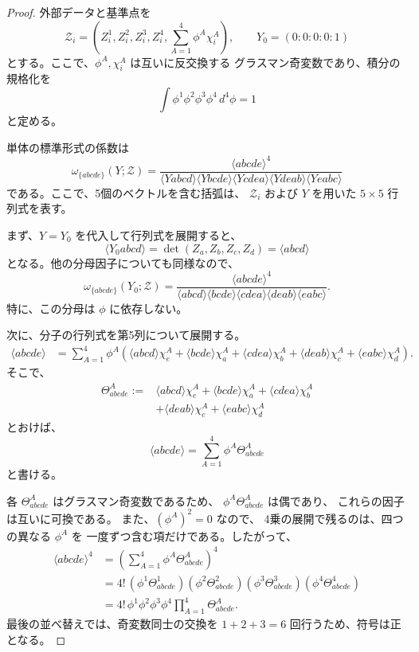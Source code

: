 \documentclass[uplatex,dvipdfmx,a4paper,11pt]{jsarticle}
\renewcommand{\proofname}{Proof}
\newenvironment{myproof}[1][\proofname]
  {\begin{proof}[#1]}
  {\end{proof}}
\numberwithin{equation}{section}
\begin{document}
\begin{myproof}
  外部データと基準点を
  \[
    \mathcal Z_i
      =
      \left(
        Z_i^1,Z_i^2,Z_i^3,Z_i^4,
        \sum_{A=1}^{4}\phi^A\chi_i^A
      \right),
    \qquad
    Y_0=(0:0:0:0:1)
  \]
  とする。ここで、$\phi^A,\chi_i^A$ は互いに反交換する
  グラスマン奇変数であり、積分の規格化を
  \[
    \int\phi^1\phi^2\phi^3\phi^4\,d^4\phi=1
  \]
  と定める。

  単体の標準形式の係数は
  \[
    \omega_{\{abcde\}}(Y;\mathcal Z)
      =
      \frac{
        \langle abcde\rangle^4
      }{
        \langle Yabcd\rangle
        \langle Ybcde\rangle
        \langle Ycdea\rangle
        \langle Ydeab\rangle
        \langle Yeabc\rangle
      }
  \]
  である。ここで、5個のベクトルを含む括弧は、
  $\mathcal Z_i$ および $Y$ を用いた
  $5\times5$ 行列式を表す。

  まず、$Y=Y_0$ を代入して行列式を展開すると、
  \[
    \langle Y_0abcd\rangle
      =\det(Z_a,Z_b,Z_c,Z_d)
      =\langle abcd\rangle
  \]
  となる。他の分母因子についても同様なので、
  \[
    \omega_{\{abcde\}}(Y_0;\mathcal Z)
      =
      \frac{
        \langle abcde\rangle^4
      }{
        \langle abcd\rangle
        \langle bcde\rangle
        \langle cdea\rangle
        \langle deab\rangle
        \langle eabc\rangle
      }.
  \]
  特に、この分母は $\phi$ に依存しない。

  次に、分子の行列式を第5列について展開する。
  \[
    \begin{aligned}
      \langle abcde\rangle
      &=
      \sum_{A=1}^{4}\phi^A
      \left(
        \langle abcd\rangle\chi_e^A
        +\langle bcde\rangle\chi_a^A
        +\langle cdea\rangle\chi_b^A
        +\langle deab\rangle\chi_c^A
        +\langle eabc\rangle\chi_d^A
      \right).
    \end{aligned}
  \]
  そこで、
  \[
    \begin{aligned}
      \Theta_{abcde}^A
      :={}&
      \langle abcd\rangle\chi_e^A
      +\langle bcde\rangle\chi_a^A
      +\langle cdea\rangle\chi_b^A\\
      &+\langle deab\rangle\chi_c^A
      +\langle eabc\rangle\chi_d^A
    \end{aligned}
  \]
  とおけば、
  \[
    \langle abcde\rangle
      =\sum_{A=1}^{4}\phi^A\Theta_{abcde}^A
  \]
  と書ける。

  各 $\Theta_{abcde}^A$ はグラスマン奇変数であるため、
  $\phi^A\Theta_{abcde}^A$ は偶であり、
  これらの因子は互いに可換である。
  また、$(\phi^A)^2=0$ なので、
  4乗の展開で残るのは、四つの異なる $\phi^A$ を
  一度ずつ含む項だけである。したがって、
  \[
    \begin{aligned}
      \langle abcde\rangle^4
      &=
      \left(
        \sum_{A=1}^{4}\phi^A\Theta_{abcde}^A
      \right)^4\\
      &=
      4!\,
      (\phi^1\Theta_{abcde}^1)
      (\phi^2\Theta_{abcde}^2)
      (\phi^3\Theta_{abcde}^3)
      (\phi^4\Theta_{abcde}^4)\\
      &=
      4!\,
      \phi^1\phi^2\phi^3\phi^4
      \prod_{A=1}^{4}\Theta_{abcde}^A.
    \end{aligned}
  \]
  最後の並べ替えでは、奇変数同士の交換を
  $1+2+3=6$ 回行うため、符号は正となる。


\end{myproof}
\end{document}
